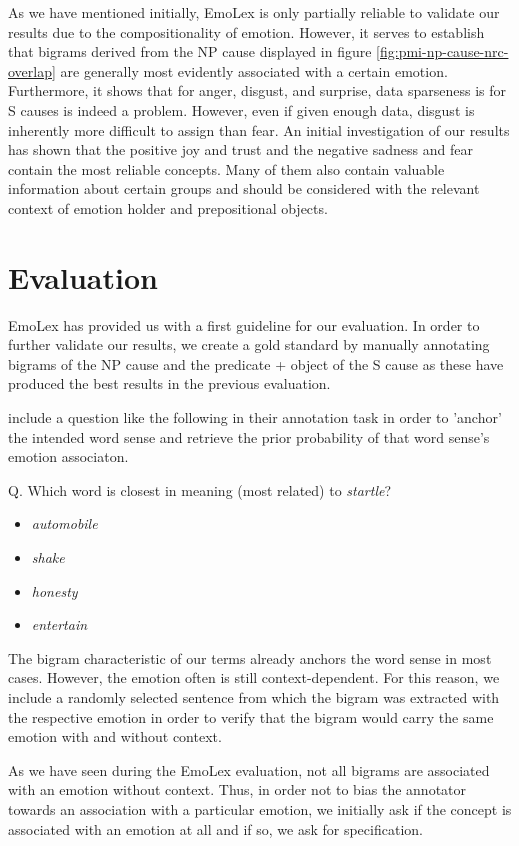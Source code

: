 As we have mentioned initially, EmoLex is only partially reliable to validate our results due to the compositionality of emotion. However, it serves to establish that bigrams derived from the NP cause displayed in figure \ref{fig:pmi-np-cause-nrc-overlap} are generally most evidently associated with a certain emotion. Furthermore, it shows that for anger, disgust, and surprise, data sparseness is for S causes is indeed a problem. However, even if given enough data, disgust is inherently more difficult to assign than fear. An initial investigation of our results has shown that the positive joy and trust and the negative sadness and fear contain the most reliable concepts. Many of them also contain valuable information about certain groups and should be considered with the relevant context of emotion holder and prepositional objects.

\section{Evaluation}

EmoLex has provided us with a first guideline for our evaluation. In order to further validate our results, we create a gold standard by manually annotating bigrams of the NP cause and the predicate + object of the S cause as these have produced the best results in the previous evaluation.

\citeauthor{nrc} include a question like the following in their annotation task in order to 'anchor' the intended word sense and retrieve the prior probability of that word sense's emotion associaton.

Q. Which word is closest in meaning (most related) to \textit{startle}?
\begin{itemize}[noitemsep,nolistsep]
	\item \textit{automobile}
	\item \textit{shake}
	\item \textit{honesty}
	\item \textit{entertain}
\end{itemize}

The bigram characteristic of our terms already anchors the word sense in most cases. However, the emotion often is still context-dependent. For this reason, we include a randomly selected sentence from which the bigram was extracted with the respective emotion in order to verify that the bigram would carry the same emotion with and without context.

As we have seen during the EmoLex evaluation, not all bigrams are associated with an emotion without context. Thus, in order not to bias the annotator towards an association with a particular emotion, we initially ask if the concept is associated with an emotion at all and if so, we ask for specification.

